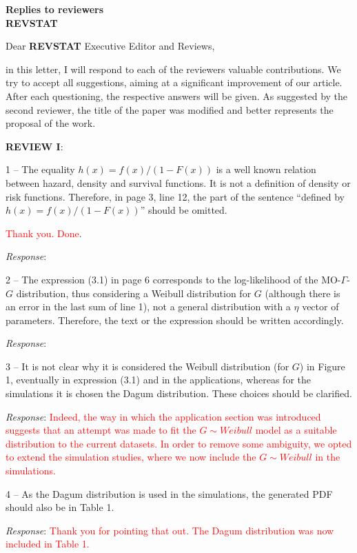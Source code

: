\documentclass[version=last,12pt,{"maintainersDelight"}]{scrlttr2}
\begin{document}
\begin{letter}{\textbf{Replies to reviewers}\\\textbf{REVSTAT}\\}
\opening{Dear \textbf{REVSTAT} Executive Editor and Reviews,}

in this letter, I will respond to each of the reviewers valuable
contributions. We try to accept all suggestions, aiming at a significant
improvement of our article. After each questioning, the respective
answers will be given. As suggested by the second reviewer, the title of
the paper was modified and better represents the proposal of the work.

\textbf{REVIEW I}:

1 -- The equality \(h(x)=f(x)/(1-F(x))\) is a well known relation
between hazard, density and survival functions. It is not a definition of density or risk functions. Therefore, in page 3, line 12, the part of the sentence ``defined by \(h(x)=f(x)/(1-F(x))\)'' should be omitted.

\textcolor{red}{Thank you. Done}. 

\emph{Response}:

2 -- The expression (3.1) in page 6 corresponds to the log-likelihood of the MO-\(\Gamma\)-\(G\) distribution, 
thus considering a Weibull distribution
for \(G\) (although there is an error in the last sum 
of line 1), not a general distribution with a \(\eta\) 
vector of parameters. Therefore, the text or the expression 
should be written accordingly.

\emph{Response}:

3 -- It is not clear why it is considered the Weibull distribution (for \(G\)) in Figure 1, eventually in expression (3.1) and in 
the applications, whereas for the simulations it is chosen the 
Dagum distribution. These choices should be clarified.

\emph{Response}:
\textcolor{red}{Indeed, the way in which the application section was introduced suggests that an attempt was made to fit the $G\sim Weibull$ model as a suitable distribution to the current datasets. In order to remove some ambiguity, we opted to extend the simulation studies, where we now include the $G\sim Weibull$ in the simulations.}

4 -- As the Dagum distribution is used in the simulations, the generated PDF should also be in Table 1.

\emph{Response}:
\textcolor{red}{Thank you for pointing that out. The Dagum distribution was now included in Table 1.}


\end{letter}
\end{document}
